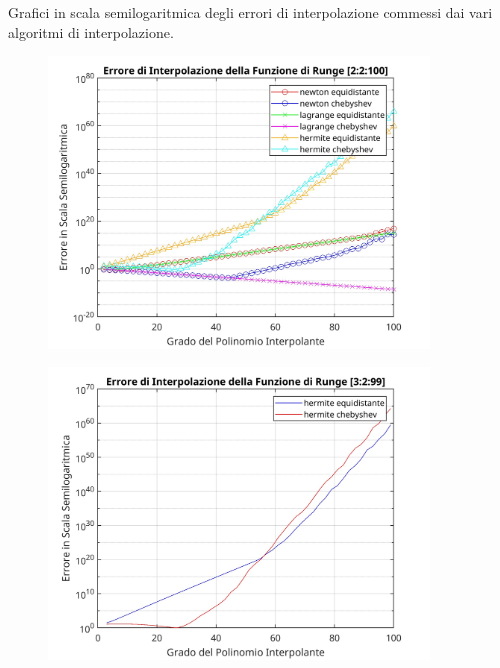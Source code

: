 \documentclass[10pt,a4paper]{article}
\begin{document}
Grafici in scala semilogaritmica degli errori di interpolazione commessi dai vari algoritmi di interpolazione.
\begin{figure}[h!]
  \centering
  \includegraphics[width=0.9\textwidth]{../figure/plot21-1}  
\end{figure}
\begin{figure}[h!]
  \centering
  \includegraphics[width=0.9\textwidth]{../figure/plot21-2}  
\end{figure}
\newpage

\section{}

\end{document}
